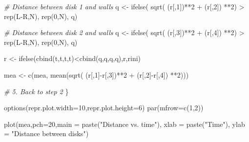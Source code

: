 \documentclass[11pt]{article}
\newenvironment{Shaded}{}{}
\newcommand{\DecValTok}[1]{\textcolor[rgb]{0.25,0.63,0.44}{{#1}}}
\newcommand{\StringTok}[1]{\textcolor[rgb]{0.25,0.44,0.63}{{#1}}}
\newcommand{\CommentTok}[1]{\textcolor[rgb]{0.38,0.63,0.69}{\textit{{#1}}}}
\newcommand{\OtherTok}[1]{\textcolor[rgb]{0.00,0.44,0.13}{{#1}}}
\newcommand{\FunctionTok}[1]{\textcolor[rgb]{0.02,0.16,0.49}{{#1}}}
\newcommand{\NormalTok}[1]{{#1}}
\newcommand{\SpecialCharTok}[1]{\textcolor[rgb]{0.25,0.44,0.63}{{#1}}}
\newcommand{\AttributeTok}[1]{\textcolor[rgb]{0.49,0.56,0.16}{{#1}}}
\begin{document}
\begin{Shaded}
\begin{Highlighting}[]
        \CommentTok{\# Distance between disk 1 and walls}
\NormalTok{        q }\OtherTok{\textless{}{-}} \FunctionTok{ifelse}\NormalTok{( }\FunctionTok{sqrt}\NormalTok{( (r[,}\DecValTok{1}\NormalTok{])}\SpecialCharTok{**}\DecValTok{2} \SpecialCharTok{+}\NormalTok{ (r[,}\DecValTok{2}\NormalTok{]) }\SpecialCharTok{**}\DecValTok{2}\NormalTok{) }\SpecialCharTok{\textgreater{}} \FunctionTok{rep}\NormalTok{(L}\SpecialCharTok{{-}}\NormalTok{R,N), }\FunctionTok{rep}\NormalTok{(}\DecValTok{0}\NormalTok{,N), q)}
        
        \CommentTok{\# Distance between disk 2 and walls}
\NormalTok{        q }\OtherTok{\textless{}{-}} \FunctionTok{ifelse}\NormalTok{( }\FunctionTok{sqrt}\NormalTok{( (r[,}\DecValTok{3}\NormalTok{])}\SpecialCharTok{**}\DecValTok{2} \SpecialCharTok{+}\NormalTok{ (r[,}\DecValTok{4}\NormalTok{]) }\SpecialCharTok{**}\DecValTok{2}\NormalTok{) }\SpecialCharTok{\textgreater{}} \FunctionTok{rep}\NormalTok{(L}\SpecialCharTok{{-}}\NormalTok{R,N), }\FunctionTok{rep}\NormalTok{(}\DecValTok{0}\NormalTok{,N), q)}
        
\NormalTok{        r }\OtherTok{\textless{}{-}} \FunctionTok{ifelse}\NormalTok{(}\FunctionTok{cbind}\NormalTok{(t,t,t,t)}\SpecialCharTok{\textless{}}\FunctionTok{cbind}\NormalTok{(q,q,q,q),r,rini)}
        
\NormalTok{        mea }\OtherTok{\textless{}{-}} \FunctionTok{c}\NormalTok{(mea, }\FunctionTok{mean}\NormalTok{(}\FunctionTok{sqrt}\NormalTok{( (r[,}\DecValTok{1}\NormalTok{]}\SpecialCharTok{{-}}\NormalTok{r[,}\DecValTok{3}\NormalTok{])}\SpecialCharTok{**}\DecValTok{2} \SpecialCharTok{+}\NormalTok{ (r[,}\DecValTok{2}\NormalTok{]}\SpecialCharTok{{-}}\NormalTok{r[,}\DecValTok{4}\NormalTok{]) }\SpecialCharTok{**}\DecValTok{2}\NormalTok{)))}
        
        \CommentTok{\# 5. Back to step 2}
\NormalTok{        \}}
    
    \FunctionTok{options}\NormalTok{(}\AttributeTok{repr.plot.width=}\DecValTok{10}\NormalTok{,}\AttributeTok{repr.plot.height=}\DecValTok{6}\NormalTok{)}
    \FunctionTok{par}\NormalTok{(}\AttributeTok{mfrow=}\FunctionTok{c}\NormalTok{(}\DecValTok{1}\NormalTok{,}\DecValTok{2}\NormalTok{))}
    
    \FunctionTok{plot}\NormalTok{(mea,}\AttributeTok{pch=}\DecValTok{20}\NormalTok{,}\AttributeTok{main =} \FunctionTok{paste}\NormalTok{(}\StringTok{"Distance vs. time"}\NormalTok{),}
             \AttributeTok{xlab =} \FunctionTok{paste}\NormalTok{(}\StringTok{"Time"}\NormalTok{), }\AttributeTok{ylab =} \StringTok{"Distance between disks"}\NormalTok{)}
    

\end{Highlighting}
\end{Shaded}
\end{document}
